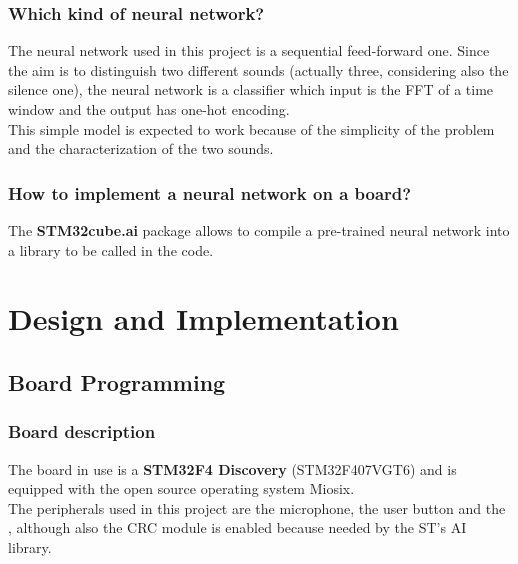 \documentclass[12pt]{article}
\begin{document}
\subsubsection{Which kind of neural network?}
The neural network used in this project is a sequential feed-forward one. Since the aim is to distinguish two different sounds (actually three, considering also the silence one), the neural network is a classifier which input is the FFT of a time window and the output has one-hot encoding.\\
This simple model is expected to work because of the simplicity of the problem and the characterization of the two sounds.

\subsubsection{How to implement a neural network on a board?}
The \textbf{STM32cube.ai} package allows to compile a pre-trained neural network into a library to be called in the code.

\section{Design and Implementation}
\subsection{Board Programming}
\subsubsection{Board description}
The board in use is a \textbf{STM32F4 Discovery} (STM32F407VGT6) and is equipped with the open source operating system Miosix.\\
The peripherals used in this project are the microphone, the user button and the , although also the CRC module is enabled because needed by the ST's AI library.
\end{document}
